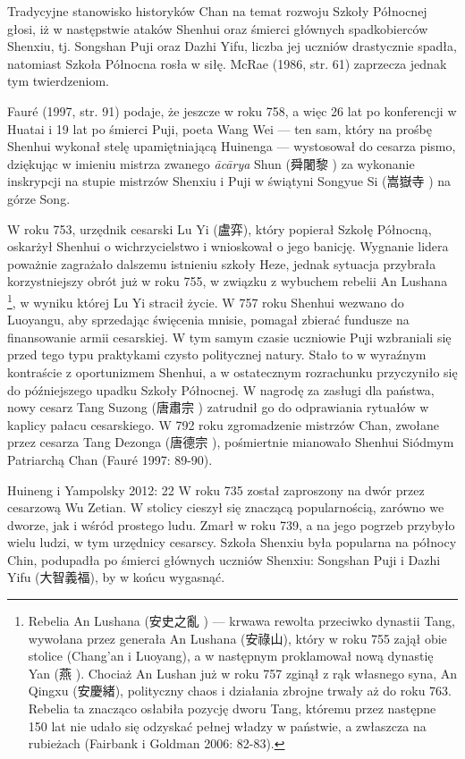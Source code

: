 Tradycyjne stanowisko historyków Chan na temat rozwoju Szkoły Północnej głosi, iż w następstwie ataków Shenhui oraz śmierci głównych spadkobierców Shenxiu, tj. Songshan Puji oraz Dazhi Yifu, liczba jej uczniów drastycznie spadła, natomiast Szkoła Północna rosła w siłę.
McRae (1986, str. 61) zaprzecza jednak tym twierdzeniom.

Fauré (1997, str. 91) podaje, że jeszcze w roku 758, a więc 26 lat po konferencji w Huatai i 19 lat po śmierci Puji, poeta Wang Wei --- ten sam, który na prośbę Shenhui wykonał stelę upamiętniającą Huinenga --- wystosował do cesarza pismo, dziękując w imieniu mistrza zwanego \textit{ācārya} Shun (舜闍黎 ) za wykonanie inskrypcji na stupie mistrzów Shenxiu i Puji w świątyni Songyue Si (嵩嶽寺 ) na górze Song.

W roku 753, urzędnik cesarski Lu Yi (盧弈), który popierał Szkołę Północną, oskarżył Shenhui o wichrzycielstwo i wnioskował o jego banicję.
Wygnanie lidera poważnie zagrażało dalszemu istnieniu szkoły Heze, jednak sytuacja przybrała korzystniejszy obrót już w roku 755, w związku z wybuchem rebelii An Lushana%
\footnote{Rebelia An Lushana (安史之亂 ) --- krwawa rewolta przeciwko dynastii Tang, wywołana przez generała An Lushana (安祿山), który w roku 755 zajął obie stolice (Chang'an i Luoyang), a w następnym proklamował nową dynastię Yan (燕 ). Chociaż An Lushan już w roku 757 zginął z rąk własnego syna, An Qingxu (安慶緒), polityczny chaos i działania zbrojne trwały aż do roku 763. Rebelia ta znacząco osłabiła pozycję dworu Tang, któremu przez następne 150 lat nie udało się odzyskać pełnej władzy w państwie, a zwłaszcza na rubieżach (Fairbank i Goldman 2006: 82-83).}, w wyniku której Lu Yi stracił życie.
W 757 roku Shenhui wezwano do Luoyangu, aby sprzedając święcenia mnisie, pomagał zbierać fundusze na finansowanie armii cesarskiej.
W tym samym czasie uczniowie Puji wzbraniali się przed tego typu praktykami czysto politycznej natury.
Stało to w wyraźnym kontraście z oportunizmem Shenhui, a w ostatecznym rozrachunku przyczyniło się do późniejszego upadku Szkoły Północnej.
W nagrodę za zasługi dla państwa, nowy cesarz Tang Suzong	(唐肅宗 ) zatrudnił go do odprawiania rytuałów w kaplicy pałacu cesarskiego.
W 792 roku zgromadzenie mistrzów Chan, zwołane przez cesarza Tang Dezonga (唐德宗 ), pośmiertnie mianowało Shenhui Siódmym Patriarchą Chan
(Fauré 1997: 89-90).

Huineng i Yampolsky 2012: 22
W roku 735 został zaproszony na dwór przez cesarzową Wu Zetian. W stolicy cieszył się znaczącą popularnością, zarówno we dworze, jak i wśród prostego ludu.
Zmarł w roku 739, a na jego pogrzeb przybyło wielu ludzi, w tym urzędnicy cesarscy.
Szkoła Shenxiu była popularna na północy Chin, podupadła po śmierci głównych uczniów Shenxiu: Songshan Puji i Dazhi Yifu (大智義福), by w końcu wygasnąć. %

